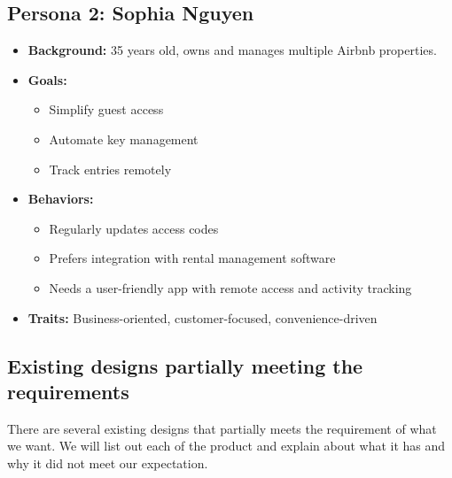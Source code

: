 \subsection{Persona 2: Sophia Nguyen}

\begin{itemize}
    \item \textbf{Background:} 35 years old, owns and manages multiple Airbnb properties.
    \item \textbf{Goals:}
    \begin{itemize}
        \item Simplify guest access
        \item Automate key management
        \item Track entries remotely
    \end{itemize}
    \item \textbf{Behaviors:}
    \begin{itemize}
        \item Regularly updates access codes
        \item Prefers integration with rental management software
        \item Needs a user-friendly app with remote access and activity tracking
    \end{itemize}
    \item \textbf{Traits:} Business-oriented, customer-focused, convenience-driven
\end{itemize}


\subsection{Existing designs partially meeting the requirements}
There are several existing designs that partially meets the requirement of what we want. We will list out each of the product and explain about what it has and why it did not meet our expectation.

